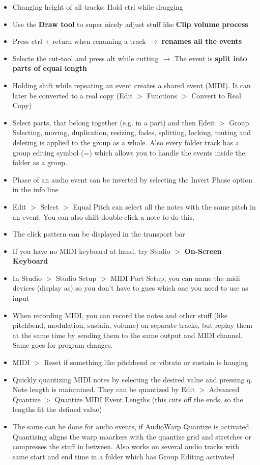 \documentclass[10pt]{article}
\begin{document}
\begin{itemize}
	\item Changing height of all tracks: Hold ctrl while dragging
	\item Use the \textbf{Draw tool} to super nicely adjust stuff like \textbf{Clip volume process}
	\item Press ctrl + return when renaming a track $\rightarrow$ \textbf{renames all the events}
	\item Selecte the cut-tool and press alt while cutting $\rightarrow$ The event is \textbf{split into parts of equal length}
	\item Holding shift while repeating an event creates a shared event (MIDI). It can later be converted to a real copy (Edit $>$ Functions $>$ Convert to Real Copy)
	\item Select parts, that belong together (e.g. in a part) and then Edeit $>$ Group. Selecting, moving, duplication, resizing, fades, splitting, locking, muting and deleting is applied to the group as a whole. Also every folder track has a group editing symbol (=) which allows you to handle the events inside the folder as a group.
	\item Phase of an audio event can be inverted by selecting the Invert Phase option in the info line
	\item Edit $>$ Select $>$ Equal Pitch can select all the notes with the same pitch in an event. You can also shift-double-click a note to do this.
	\item The click pattern can be displayed in the transport bar
	\item If you have no MIDI keyboard at hand, try Studio $>$ \textbf{On-Screen Keyboard}
	\item In Studio $>$ Studio Setup $>$ MIDI Port Setup, you can name the midi devices (display as) so you don't have to gues which one you need to use as input
	\item When recording MIDI, you can record the notes and other stuff (like pitchbend, modulation, sustain, volume) on separate tracks, but replay them at the same time by sending them to the same output and MIDI channel. Same goes for program changes.
	\item MIDI $>$ Reset if something like pitchbend or vibrato or sustain is hanging
	\item Quickly quantizing MIDI notes by selecting the desired value and pressing q. Note length is maintained. They can be quantized by Edit $>$ Advanced Quantize $>$ Quantize MIDI Event Lengths (this cuts off the ends, so the lengths fit the defined value)
	\item The same can be done for audio events, if AudioWarp Quantize is activated. Quantizing aligns the warp maarkers with the quantize grid and stretches or compresses the stuff in between. Also works on several audio tracks with same start and end time in a folder which has Group Editing activated

\end{itemize}
\end{document}
